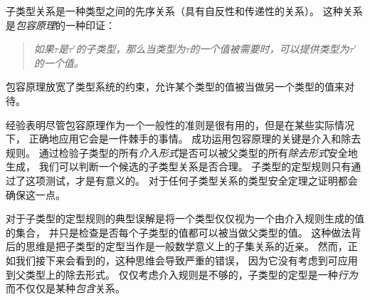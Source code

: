 子类型关系是一种类型之间的先序关系（具有自反性和传递性的关系）。
这种关系是\textit{包容原理}的一种印证：
\begin{quotation}
    \textit{如果$\tau$是$\tau{'}$的子类型，那么当类型为$\tau$的一个值被需要时，可以提供类型为$\tau{'}$的一个值。}
\end{quotation}
包容原理放宽了类型系统的约束，允许某个类型的值被当做另一个类型的值来对待。

经验表明尽管包容原理作为一个一般性的准则是很有用的，但是在某些实际情况下，
正确地应用它会是一件棘手的事情。
成功运用包容原理的关键是介入和除去规则。
通过检验子类型的所有\textit{介入形式}是否可以被父类型的所有\textit{除去形式}安全地生成，
我们可以判断一个候选的子类型关系是否合理。
子类型的定型规则只有通过了这项测试，才是有意义的。
对于任何子类型关系的类型安全定理之证明都会确保这一点。

对于子类型的定型规则的典型误解是将一个类型仅仅视为一个由介入规则生成的值的集合，
并只是检查是否每个子类型的值都可以被当做父类型的值。
这种做法背后的思维是把子类型的定型当作是一般数学意义上的子集关系的近亲。
然而，正如我们接下来会看到的，这种思维会导致严重的错误，
因为它没有考虑到可应用到父类型上的除去形式。
仅仅考虑介入规则是不够的，子类型的定型是一种\textit{行为}而不仅仅是某种\textit{包含}关系。